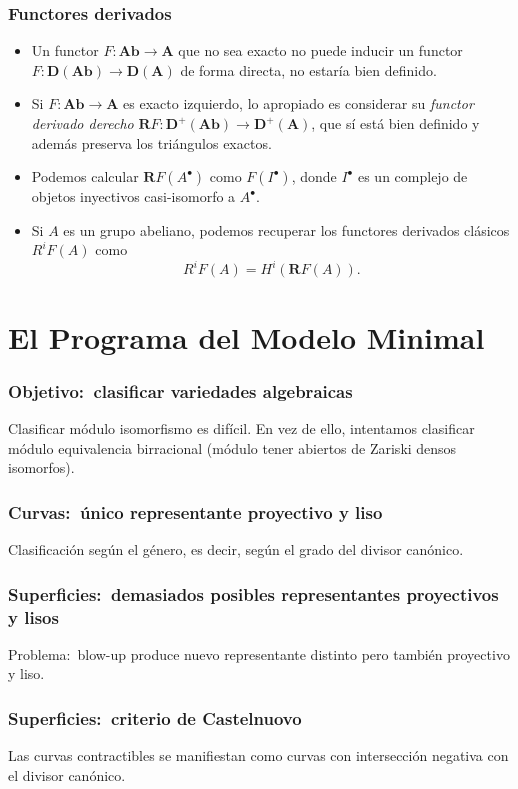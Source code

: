 \documentclass[12pt]{beamer}
\begin{document}
\begin{frame}
  \frametitle{Functores derivados}
  \begin{itemize}
    \item Un functor $F \colon \mathbf{Ab} \to \mathbf{A}$ que no sea exacto no puede inducir un functor $F \colon \mathbf{D}(\mathbf{Ab}) \to \mathbf{D}(\mathbf{A})$ de forma directa, no estaría bien definido.
      \pause
    \item Si $F \colon \mathbf{Ab} \to \mathbf{A}$ es exacto izquierdo, lo apropiado es considerar su \textit{functor derivado derecho} $\mathbf{R}F \colon \mathbf{D}^{+}(\mathbf{Ab}) \to \mathbf{D}^{+}(\mathbf{A})$, que sí está bien definido y además preserva los triángulos exactos.
      \pause
    \item Podemos calcular $\mathbf{R}F(A^{\bullet})$ como $F(I^{\bullet})$, donde $I^{\bullet}$ es un complejo de objetos inyectivos casi-isomorfo a $A^{\bullet}$.
      \pause
    \item Si $A$ es un grupo abeliano, podemos recuperar los functores derivados clásicos $R^{i}F(A)$ como
      \[ R^{i}F(A) = H^{i}(\mathbf{R}F(A)). \]
  \end{itemize}
\end{frame}

\section{El Programa del Modelo Minimal}

\begin{frame}
  \frametitle{Objetivo:~clasificar variedades algebraicas}
  Clasificar módulo isomorfismo es difícil.
  En vez de ello, intentamos clasificar módulo equivalencia birracional (módulo tener abiertos de Zariski densos isomorfos).
\end{frame}

\begin{frame}
  \frametitle{Curvas:~único representante proyectivo y liso}
  Clasificación según el género, es decir, según el grado del divisor canónico.
\end{frame}

\begin{frame}
  \frametitle{Superficies:~demasiados posibles representantes proyectivos y lisos}
  Problema:~blow-up produce nuevo representante distinto pero también proyectivo y liso.
\end{frame}

\begin{frame}
  \frametitle{Superficies:~criterio de Castelnuovo}
  Las curvas contractibles se manifiestan como curvas con intersección negativa con el divisor canónico.
\end{frame}
\end{document}
